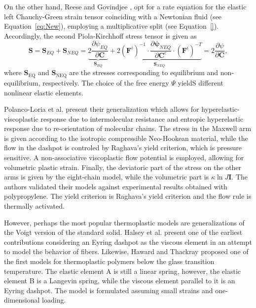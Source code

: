 On the other hand, Reese and Govindjee \citep{reeseTheoryFiniteViscoelasticity1998}, opt for a rate equation for the elastic left Chauchy-Green strain tensor coinciding with a Newtonian fluid (see Equation~\eqref{eq:New}), employing a multiplicative split (see Equation~\eqref{}).
Accordingly, the second Piola-Kirchhoff stress tensor is given as
\begin{equation}
	\mathbf{S}=\mathbf{S}_{E Q}+\mathbf{S}_{N E Q}=\underbrace{2 \frac{\partial \psi_{E Q}}{\partial \mathbf{C}}}_{\mathbf{S}_{E Q}}+\underbrace{2 (\mathbf{F}^i)^{-1} \cdot \frac{\partial \mathbf{\psi}_{N E Q}}{\partial \mathbf{C}^e} \cdot (\mathbf{F}^i)^{-T}}_{\mathbf{S}_{N E Q}}=2 \frac{\partial \psi}{\partial \mathbf{C}},
\end{equation}
where $\mathbf S_\text{EQ}$ and $\mathbf S_\text{NEQ}$ are the stresses corresponding to equilibrium and non-equilibrium, respectively.
The choice of the free energy $\Psi$ yieldS different nonlinear elastic elements.

Polanco-Loria et al. \citep{polanco-loriaConstitutiveModelThermoplastics2010} present their generalization which allows for hyperelastic-viscoplastic response due to intermolecular resistance and entropic hyperelastic response due to re-orientation of molecular chains.
The stress in the Maxwell arm is given according to the isotropic compressible Neo-Hookean material, while the flow in the dashpot is controled by Raghava's yield criterion, which is pressure sensitive.
A non-associative viscoplastic flow potential is employed, allowing for volumetric plastic strain.
Finally, the deviatoric part of the stress on the other arms is given by the eight-chain model, while the volumetric part is $\kappa \ln J\mathbf I$.
The authors validated their models against experimental results obtained with polypropylene.
The yield criterion is Raghava's yield criterion and the flow rule is thermally activated.

However, perhaps the most popular thermoplastic models are generalizations of the Voigt version of the standard solid.
Halsey et al. \citep{halseyMechanicalPropertiesTextiles1945} present one of the earliest contributions considering an Eyring dashpot as the viscous element in an attempt to model the behavior of fibers.
Likewise, Haward and Thackray \citep{hawardUseMathematicalModel1968} proposed one of the first models for thermoplastic polymers below the glass transition temperature.
The elastic element A is still a linear spring, however, the elastic element B is a Langevin spring, while the viscous element parallel to it is an Eyring dashpot.
The model is formulated assuming small strains and one-dimensional loading.


